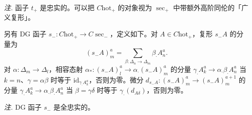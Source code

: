 \emph{注.} 函子 $t_{+}$ 是忠实的。可以把 $C\mathrm{hot}_{+}$ 的对象视为 $\sec_{+}$ 中带额外高阶同伦的「广义复形」。

另有 DG 函子 $s_{-}:C\mathrm{hot}_{+}\to C\sec_{-}$，定义如下。对 $A\in C\mathrm{hot}_{+}$，复形 $s_{-}A$ 的分量为
\[
(s_{-}A)^{a}_{m}=\sum_{\beta:\Delta_{n}\to\Delta_{m}}\beta_{\cdot}A^{a}_{n}.
\]
对 $\alpha:\Delta_{m}\to\Delta_{l}$，相容态射 $\alpha_{*}:(s_{-}A)^{a}_{l}\to\alpha_{\cdot}(s_{-}A)^{a}_{m}$ 的分量 $\gamma_{\cdot}A^{a}_{k}\to\alpha_{\cdot}\beta_{\cdot}A^{a}_{n}$ 当 $k=n$、$\gamma=\alpha\beta$ 时等于 $\mathrm{id}_{\gamma_{\cdot}A^{a}_{k}}$，否则为零。微分 $d_{s_{-}A}:(s_{-}A)^{a}_{m}\to(s_{-}A)^{a+1}_{m}$ 的分量 $\gamma_{\cdot}A^{a}_{k}\to\alpha_{\cdot}\beta_{\cdot}A^{a}_{n}$ 当 $\beta=\gamma\delta$ 时等于 $\gamma_{\cdot}(d_{A\delta})$，否则为零。

\emph{注.} DG 函子 $s_{-}$ 是全忠实的。
